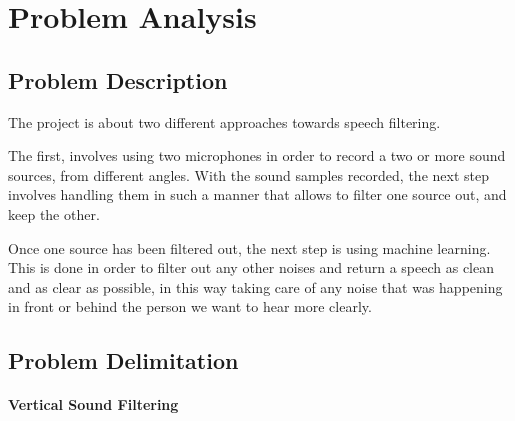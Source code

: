 \chapter{Problem Analysis}\label{ch:problemAnalysis}
\section{Problem Description}
The project is about two different approaches towards speech filtering.

The first, involves using two microphones in order to record a two or 
more sound sources, from different angles.
With the sound samples recorded, the next step involves handling them 
in such a manner that allows to filter one source out, and keep the other.

Once one source has been filtered out, the next step is using machine 
learning. This is done in order to filter out any other noises and return 
a speech as clean and as clear as possible, in this way taking care of any 
noise that was happening in front or behind the person we want to hear 
more clearly.
\section{Problem Delimitation}
\subsubsection{Vertical Sound Filtering}
